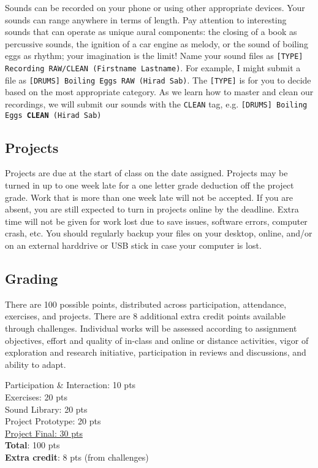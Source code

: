 Sounds can be recorded on your phone or using other appropriate devices. Your sounds can range anywhere in terms of length. Pay attention to interesting sounds that can operate as unique aural components: the closing of a book as percussive sounds, the ignition of a car engine as melody, or the sound of boiling eggs as rhythm; your imagination is the limit! Name your sound files as \texttt{[TYPE] Recording RAW/CLEAN (Firstname Lastname)}. For example, I might submit a file as \texttt{[DRUMS] Boiling Eggs RAW (Hirad Sab)}. The \texttt{[TYPE]} is for you to decide based on the most appropriate category. As we learn how to master and clean our recordings, we will submit our sounds with the \texttt{CLEAN} tag, e.g. \texttt{[DRUMS] Boiling Eggs \textbf{CLEAN} (Hirad Sab)}

\subsection{Projects}

Projects are due at the start of class on the date assigned. Projects may be turned in up to one week late for a one letter grade deduction off the project grade. Work that is more than one week late will not be accepted. If you are absent, you are still expected to turn in projects online by the deadline. Extra time will not be given for work lost due to save issues, software errors, computer crash, etc. You should regularly backup your files on your desktop, online, and/or on an external harddrive or USB stick in case your computer is lost.

\subsection{Grading}

There are 100 possible points, distributed across participation, attendance, exercises, and projects. There are 8 additional extra credit points available through challenges. Individual works will be assessed according to assignment objectives, effort and quality of in-class and online or distance activities, vigor of exploration and research initiative, participation in reviews and discussions, and ability to adapt.

\hspace*{1em} Participation \& Interaction: 10 pts\\
\hspace*{1em} Exercises: 20 pts\\
\hspace*{1em} Sound Library: 20 pts\\
\hspace*{1em} Project Prototype: 20 pts\\
\hspace*{1em} \ul{Project Final: 30 pts}\\
\hspace*{1em} \textbf{Total}: 100 pts\\
\hspace*{1em} \textbf{Extra credit}: 8 pts (from challenges)

